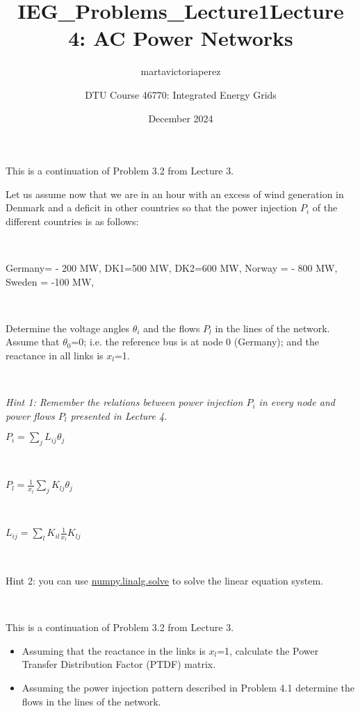 \documentclass[10pt]{article}
\title{IEG_Problems_Lecture1}
\author{martavictoriaperez }
\date{December 2024}
\newenvironment{problem}[2][Problem]{\begin{trivlist}
\item[\hskip \labelsep {\bfseries #1}\hskip \labelsep {\bfseries #2.}]}{\end{trivlist}}
\begin{document}
 
\title{\textbf{Lecture 4: AC Power Networks}}
\author{
DTU Course 46770: Integrated Energy Grids }
\maketitle
\begin{problem}{4.1}

This is a continuation of Problem 3.2 from Lecture 3.

Let us assume now that we are in an hour with an excess of wind generation in Denmark and a deficit in other countries so that the power injection $P_i$ of the different countries is as follows:

\

Germany= - 200 MW, DK1=500 MW, DK2=600 MW, Norway = - 800 MW, Sweden = -100 MW, 

\

Determine the voltage angles $\theta_i$  and the flows $P_l$ in the lines of the network. Assume that $\theta_0$=0; i.e. the reference bus is at node 0 (Germany); and the reactance in all links is $x_l$=1.

\

\textit{Hint 1: Remember the relations between power injection $P_i$ in every node and power flows $P_l$ presented in Lecture 4.}

$P_i=\sum_j {L_{ij} \theta_j } $

\

$P_l=\frac{1}{x_l}  \sum_j{K_{lj} \theta_j}$       

\

$L_{ij}=\sum_l{K_{il} \frac{1}{x_l} K_{lj}}$

\

Hint 2: you can use \href{https://numpy.org/doc/2.1/reference/generated/numpy.linalg.solve.html}{numpy.linalg.solve} to solve the linear equation system. 



\end{problem}

\

\begin{problem}{4.2}

This is a continuation of Problem 3.2 from Lecture 3.

\begin{itemize}

\item[a)] Assuming that the reactance in the links is $x_l$=1, calculate the Power Transfer Distribution Factor (PTDF) matrix.

\item[b)] Assuming the power injection pattern described in Problem 4.1 determine the flows in the lines of the network. 

\end{itemize}

\end{problem}
\end{document}
